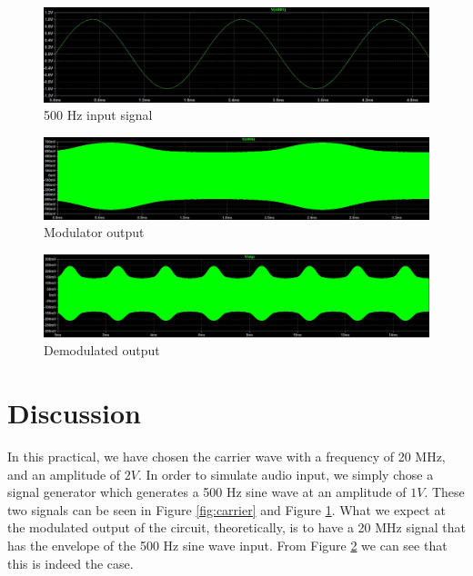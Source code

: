 \documentclass[12pt, a4paper]{article}
\begin{document}
	\begin{figure}[H]
		\centering
		\includegraphics[width=\textwidth]{images/modulating.JPG}
		\caption{500 Hz input signal}
		\label{fig:modulating}
	\end{figure}

	\begin{figure}[H]
		\centering
		\includegraphics[width=\textwidth]{images/output_modulated.JPG}
		\caption{Modulator output}
		\label{fig:output_modulated}
	\end{figure}

	\begin{figure}[H]
		\centering
		\includegraphics[width=\textwidth]{images/output_demodulated.JPG}
		\caption{Demodulated output}
		\label{fig:output_demodulated}
	\end{figure}

\section{Discussion} %
\label{sec:discussion}
	In this practical, we have chosen the carrier wave with a frequency of 20 MHz, and an amplitude of $2V$. In order to simulate audio input, we simply chose a signal generator which generates a 500 Hz sine wave at an amplitude of $1V$. These two signals can be seen in Figure \ref{fig:carrier} and Figure \ref{fig:modulating}. What we expect at the modulated output of the circuit, theoretically, is to have a 20 MHz signal that has the envelope of the 500 Hz sine wave input. From Figure \ref{fig:output_modulated} we can see that this is indeed the case.
\end{document}
